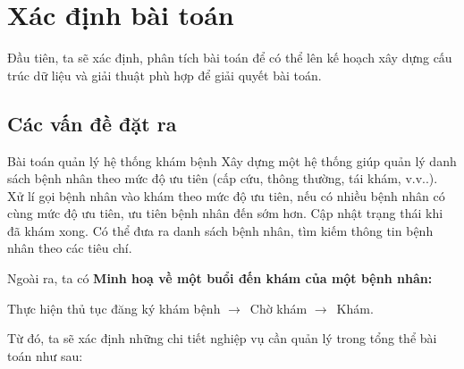 \section{Xác định bài toán}
Đầu tiên, ta sẽ xác định, phân tích bài toán để có thể lên kế hoạch xây dựng cấu trúc dữ liệu và giải thuật phù hợp để giải quyết bài toán.
\subsection{Các vấn đề đặt ra}
\begin{block}{Bài toán quản lý hệ thống khám bệnh}
Xây dựng một hệ thống giúp quản lý danh sách bệnh nhân theo mức độ ưu tiên (cấp cứu, thông thường, tái khám, v.v..). Xử lí gọi bệnh nhân vào khám theo mức độ ưu tiên, nếu có nhiều bệnh nhân có cùng mức độ ưu tiên, ưu tiên bệnh nhân đến sớm hơn. Cập nhật trạng thái khi đã khám xong. Có thể đưa ra danh sách bệnh nhân, tìm kiếm thông tin bệnh nhân theo các tiêu chí.
\end{block}
\noindent Ngoài ra, ta có \textcolor{FamiBlue}{\bf Minh hoạ về một buổi đến khám của một bệnh nhân:}\begin{center}\textcolor{HustRed}{ Thực hiện thủ tục đăng ký khám bệnh} $\rightarrow\,$\textcolor{HustRed}{  Chờ khám} $\rightarrow\,$\textcolor{HustRed}{  Khám.}\end{center}
\noindent Từ đó, ta sẽ xác định những chi tiết nghiệp vụ cần quản lý trong tổng thể bài toán như sau:
